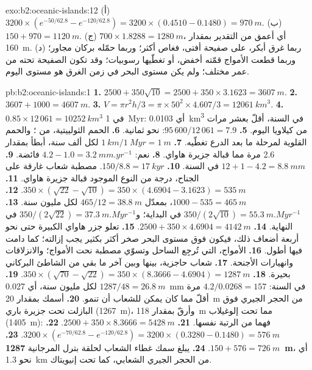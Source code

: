 \begin{solution}{exo:b2:oceanic-islands:12}
(أ) $3200\times(e^{-50/62.8} - e^{-120/62.8}) = 3200\times(0.4510 - 0.1480) = \qty{970}{m}$.
(ب) $150 + 970 = \qty{1120}{m}$. (ج) $700\times1.8288 = \qty{1280}{m}$، أي أعمق من
التقدير بمقدار \qty{160}{m}. (د) ربما غرق  أبكر، على صفيحة أفتى، فغاص أكثر؛ وربما حمّله بركان
مجاور؛ وربما قطعت الأمواج قمّته أخفض، أو تغطّيها رسوبيات؛ وقد تكون
الصفيحة تحته من عمر مختلف؛ ولم يكن مستوى البحر في زمن الغرق هو مستوى
اليوم.
\end{solution}

\begin{solution}{pb:b2:oceanic-islands:1}
\textbf{1.} $2500 + 350\sqrt{10} = 2500 + 350\times3.1623 = \qty{3607}{m}$.
\textbf{2.} $3607 + 1000 = \qty{4607}{m}$.
\textbf{3.} $V = \pi r^2h/3 = \pi\times50^2\times4.607/3 = \qty{12061}{km^3}$.
\textbf{4.} $0.85\times12\,061 = \qty{10252}{km^3}$ في \qty{1}{Myr}: أي \qty{0.0103}{km^3} في السنة،
أقلّ بعشر مرات من كيلاويا اليوم.
\textbf{5.} $95\,600/12\,061 = 7.9$: نحو ثمانية.
\textbf{6.} الحمم الثولييتية، من ؛ والحمم القلوية لمرحلة ما بعد الدرع
تغطّيه.
\textbf{7.} $\qty{1}{km}/\qty{1}{Myr} = \qty{1}{m}$ لكل ألف سنة، أبطأ بمقدار 2.6 مرة مما قبالة
جزيرة هاواي.
\textbf{8.} نعم: $4.2 - 1.0 = \qty{3.2}{mm.yr^{-1}}$ فائضة.
\textbf{9.} $12 + 1 - 4.2 = \qty{8.8}{mm}$ في السنة.
\textbf{10.} $150/8.8 = \qty{17}{kyr}$. مصطبة شعاب غارقة على الجناح، درجة من النوع
الموجود قبالة جزيرة هاواي.
\textbf{11.} $350\times(\sqrt{22} - \sqrt{10}) = 350\times(4.6904 - 3.1623) = \qty{535}{m}$.
\textbf{12.} $1000 - 535 = \qty{465}{m}$، بمعدّل $465/12 = \qty{38.8}{m}$ لكل مليون سنة.
\textbf{13.} $350/(2\sqrt{10}) = \qty{55.3}{m.Myr^{-1}}$ في البداية؛ و$350/(2\sqrt{22}) =
\qty{37.3}{m.Myr^{-1}}$ في النهاية.
\textbf{14.} $2500 + 350\times4.6904 = \qty{4142}{m}$.
\textbf{15.} تعلو جزر هاواي الكبيرة حتى نحو أربعة أضعاف ذلك، فيكون فوق مستوى البحر صخر أكثر بكثير
يجب إزالته؛ كما دامت  فيها أطول.
\textbf{16.} الأمواج، التي تُرجِع الساحل وتسوّي مصطبة نحت الأمواج؛ والانزلاقات وانهيارات
الأجنحة.
\textbf{17.} شعاب حاجزية، بينها وبين آخر ما بقي من الشاطئ البركاني بحيرة.
\textbf{18.} $350\times(\sqrt{70} - \sqrt{22}) = 350\times(8.3666 - 4.6904) = \qty{1287}{m}$.
\textbf{19.} $1287/48 = \qty{26.8}{m}$ لكل مليون سنة، أي \qty{0.027}{mm} في السنة: $4.2/0.0268 =
157$ مرة أقلّ مما كان يمكن للشعاب أن تنمو.
\textbf{20.} أسمك بمقدار \qty{20}{m} من الحجر الجيري فوق البازلت تحت جزيرة باري
(\qty{1267}{m})، وأرقّ بمقدار \qty{118}{m} مما تحت إلوغيلاب (\qty{1405}{m}): فهما من الرتبة نفسها.
\textbf{21.} $2500 + 350\times8.3666 = \qty{5428}{m}$.
\textbf{22.} $3200\times(e^{-70/62.8} - e^{-120/62.8}) = 3200\times(0.3280 - 0.1480) =
\qty{576}{m}$.
\textbf{23.} $150 + 576 = \qty{726}{m}$.
\textbf{24.} يبلغ سمك غطاء الشعاب لحلقة بترل المرجانية \textbf{\qty{1287}{m}}، أي نحو \qty{1.3}{km}
من الحجر الجيري الشعابي، كما تحت إنيويتاك.
\end{solution}
